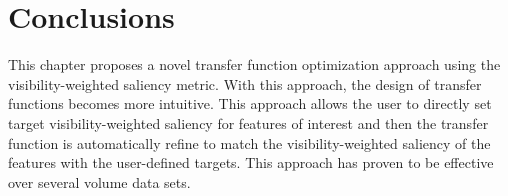 \section{Conclusions}
This chapter proposes a novel transfer function optimization approach using the visibility-weighted saliency metric.
With this approach, the design of transfer functions becomes more intuitive. This approach allows the user to directly set target visibility-weighted saliency for features of interest and then the transfer function is automatically refine to match the visibility-weighted saliency of the features with the user-defined targets.
This approach has proven to be effective over several volume data sets.
